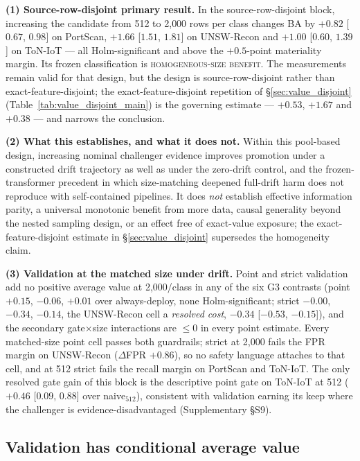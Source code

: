 \documentclass[a4paper,fleqn]{cas-sc}
\begin{document}
\textbf{(1) Source-row-disjoint primary result.} In the source-row-disjoint block, increasing the candidate from 512 to 2{,}000 rows per class changes BA by $+0.82$ [$0.67$, $0.98$] on PortScan, $+1.66$ [$1.51$, $1.81$] on UNSW-Recon and $+1.00$ [$0.60$, $1.39$] on ToN-IoT --- all Holm-significant and above the $+0.5$-point materiality margin. Its frozen classification is \textsc{homogeneous-size benefit}. The measurements remain valid for that design, but the design is source-row-disjoint rather than exact-feature-disjoint; the exact-feature-disjoint repetition of \S\ref{sec:value_disjoint} (Table~\ref{tab:value_disjoint_main}) is the governing estimate --- $+0.53$, $+1.67$ and $+0.38$ --- and narrows the conclusion.

\textbf{(2) What this establishes, and what it does not.} Within this pool-based design, increasing nominal challenger evidence improves promotion under a constructed drift trajectory as well as under the zero-drift control, and the frozen-transformer precedent in which size-matching deepened full-drift harm does not reproduce with self-contained pipelines. It does \emph{not} establish effective information parity, a universal monotonic benefit from more data, causal generality beyond the nested sampling design, or an effect free of exact-value exposure; the exact-feature-disjoint estimate in \S\ref{sec:value_disjoint} supersedes the homogeneity claim.



\textbf{(3) Validation at the matched size under drift.} Point and strict validation add no positive average value at 2{,}000/class in any of the six G3 contrasts (point $+0.15$, $-0.06$, $+0.01$ over always-deploy, none Holm-significant; strict $-0.00$, $-0.34$, $-0.14$, the UNSW-Recon cell a \emph{resolved cost}, $-0.34$ [$-0.53$, $-0.15$]), and the secondary gate$\times$size interactions are $\le 0$ in every point estimate. Every matched-size point cell passes both guardrails; strict at 2{,}000 fails the FPR margin on UNSW-Recon ($\Delta$FPR $+0.86$), so no safety language attaches to that cell, and at 512 strict fails the recall margin on PortScan and ToN-IoT. The only resolved gate gain of this block is the descriptive point gate on ToN-IoT at 512 ($+0.46$ [$0.09$, $0.88$] over naive$_{512}$), consistent with validation earning its keep where the challenger is evidence-disadvantaged (Supplementary \S S9).

\subsection{Validation has conditional average value}
\label{sec:gatevalue}
\end{document}
